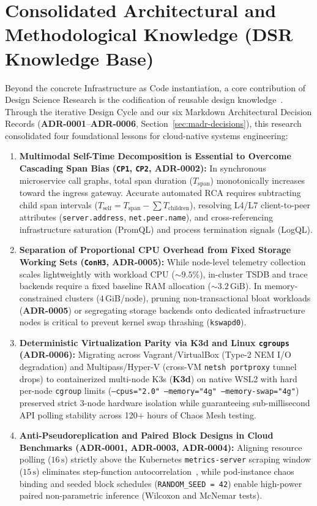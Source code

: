 \section{Consolidated Architectural and Methodological Knowledge (DSR Knowledge Base)}
\label{sec:consolidated-decisions}

Beyond the concrete Infrastructure as Code instantiation, a core contribution of Design Science Research is the codification of reusable design knowledge~\cite{gregor_2013}. Through the iterative Design Cycle and our six Markdown Architectural Decision Records (\textbf{ADR-0001}--\textbf{ADR-0006}, Section~\ref{sec:madr-decisions}), this research consolidated four foundational lessons for cloud-native systems engineering:

\begin{enumerate}
    \item \textbf{Multimodal Self-Time Decomposition is Essential to Overcome Cascading Span Bias (\texttt{CP1}, \texttt{CP2}, ADR-0002):} In synchronous microservice call graphs, total span duration ($T_{\text{span}}$) monotonically increases toward the ingress gateway. Accurate automated RCA requires subtracting child span intervals ($T_{\text{self}} = T_{\text{span}} - \sum T_{\text{children}}$), resolving L4/L7 client-to-peer attributes (\texttt{server.address}, \texttt{net.peer.name}), and cross-referencing infrastructure saturation (PromQL) and process termination signals (LogQL).
    \item \textbf{Separation of Proportional CPU Overhead from Fixed Storage Working Sets (\texttt{ConH3}, ADR-0005):} While node-level telemetry collection scales lightweightly with workload CPU ($\sim 9.5\%$), in-cluster TSDB and trace backends require a fixed baseline RAM allocation ($\sim 3.2\,\text{GiB}$). In memory-constrained clusters ($4\,\text{GiB}$/node), pruning non-transactional bloat workloads (\textbf{ADR-0005}) or segregating storage backends onto dedicated infrastructure nodes is critical to prevent kernel swap thrashing (\texttt{kswapd0}).
    \item \textbf{Deterministic Virtualization Parity via K3d and Linux \texttt{cgroups} (ADR-0006):} Migrating across Vagrant/VirtualBox (Type-2 NEM I/O degradation) and Multipass/Hyper-V (cross-VM \texttt{netsh portproxy} tunnel drops) to containerized multi-node K3s (\textbf{K3d}) on native WSL2 with hard per-node \texttt{cgroup} limits (\texttt{--cpus="2.0" --memory="4g" --memory-swap="4g"}) preserved strict 3-node hardware isolation while guaranteeing sub-millisecond API polling stability across 120+ hours of Chaos Mesh testing.
    \item \textbf{Anti-Pseudoreplication and Paired Block Designs in Cloud Benchmarks (ADR-0001, ADR-0003, ADR-0004):} Aligning resource polling ($16\,\text{s}$) strictly above the Kubernetes \texttt{metrics-server} scraping window ($15\,\text{s}$) eliminates step-function autocorrelation~\cite{hurlbert_1984}, while pod-instance chaos binding and seeded block schedules (\texttt{RANDOM\_SEED = 42}) enable high-power paired non-parametric inference (Wilcoxon and McNemar tests).
\end{enumerate}

